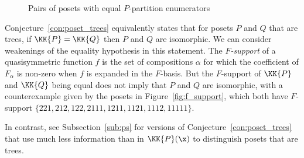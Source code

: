 \begin{remark}
\begin{figure}
\begin{center}
\end{center}
\caption{Pairs of posets with equal $P$-partition enumerators}
\label{fig:equal_kp}
\end{figure}

Conjecture~\ref{con:poset_trees} equivalently states that for posets $P$ and $Q$ that are trees, if $\KK{P} = \KK{Q}$ then $P$ and $Q$ are isomorphic.  We can consider weakenings of the equality hypothesis in this statement.  The \emph{$F$-support} of a quasisymmetric function $f$ is the set of compositions $\alpha$ for which the coefficient of $F_\alpha$ is non-zero when $f$ is expanded in the $F$-basis.  But the $F$-support of $\KK{P}$ and  $\KK{Q}$ being equal does not imply that $P$ and $Q$ are isomorphic, with a counterexample given by the posets in Figure~\ref{fig:f_support}, which both have $F$-support $\{221, 212, 122, 2111, 1211, 1121, 1112, 11111\}$.

In contrast, see Subsection~\ref{sub:ps} for versions of Conjecture~\ref{con:poset_trees} that use much less information than in $\KK{P}(\x)$ to distinguish posets that are trees.


\end{remark}
